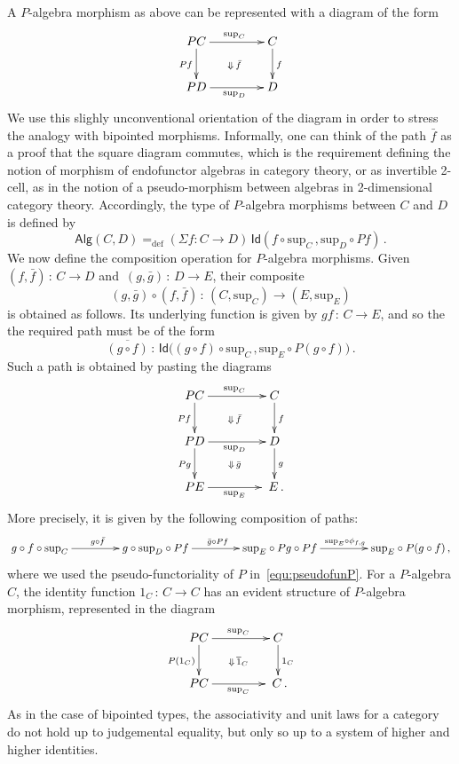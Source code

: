 \documentclass[10pt,a4paper,oneside,reqno]{amsart}
\numberwithin{equation}{section}
\theoremstyle{mythm}
\theoremstyle{mydef}
\theoremstyle{myrmk}
\newcommand{\defeq}{=_{\mathrm{def}}}
\newcommand{\co}{\,{:}\,}
\newcommand{\Id}{\mathsf{Id}}
\newcommand{\Palg}{\mathsf{Alg}}
\renewcommand{\sup}{\mathrm{sup}}
\begin{document}
A $P$-algebra morphism as above can be represented with a diagram of the form
\[
\xymatrix@C=1.5cm{
 PC \ar[r]^{\sup_C} \ar[d]_{Pf}  \ar@{}[dr]|{\Downarrow \, \bar{f}} &  C \ar[d]^{f}\\
PD \ar[r]_{\sup_D}   & D}
\] 
We use this slighly unconventional orientation of the diagram in order to stress the analogy with bipointed morphisms.
Informally, one can think of the path $\bar{f}$ as a proof that the square diagram commutes, which is the 
requirement defining the notion of morphism of endofunctor algebras in category theory, or as invertible
2-cell, as in the notion of a pseudo-morphism between algebras in 2-dimensional category theory.  
Accordingly, the type of $P$-algebra 
morphisms between $C$ and $D$ is defined by
\[
\Palg(C,D)
 \defeq  
(\Sigma f:  C \rightarrow D) \, \Id(f\circ \sup_C  \, , \sup_D \circ P f    )  \, .
\]
We now define the composition operation for $P$-algebra morphisms. Given $(f, \bar{f}) \co C \to D$ and~$(g, \bar{g}) \co D \to E$,
their composite 
\[
(g, \bar{g}) \circ (f, \bar{f}) \co (C, \sup_C) \to (E, \sup_E)
\] 
is obtained as follows. Its underlying function is given by $gf\co C \to E$, and so the 
the required path must be of the form
\[
 \overline{(g \circ f)} \co \Id\big( (g \circ f) \circ \sup_C   \, ,  \sup_E \circ P(g \circ f)  \big)\, .
\]
Such a path is obtained by pasting the diagrams 
\[
\xymatrix@C=1.5cm{
 PC \ar[r]^{\sup_C} \ar[d]_{Pf}  \ar@{}[dr]|{\Downarrow \, \bar{f}} &  C \ar[d]^{f}\\
PD \ar[r]_{\sup_D}  \ar[d]_{Pg}   \ar@{}[dr]|{\Downarrow \, \bar{g}} & D \ar[d]^g  \\
PE \ar[r]_{\sup_E} & \; E  \, .}
\] 
More precisely, it is given by the following composition of paths:
\[
\xymatrix@C=1.5cm{
g \circ f \circ \sup_C \ar[r]^{g \circ \bar{f}} & 
g \circ \sup_D \circ Pf \ar[r]^{\bar{g} \circ Pf} & 
\sup_E \circ Pg \circ Pf \ar[r]^{\sup_E \circ \phi_{f,g}} &
\sup_E \circ P(g \circ f) \, ,}
\]
where we used the pseudo-functoriality of $P$ in~\eqref{equ:pseudofunP}. 
For a $P$-algebra $C$,  the identity function $1_C \co C \to C$ has an evident structure of $P$-algebra morphism,
represented in the diagram
\begin{equation}
\label{equ:palgid}
\xymatrix@C=1.5cm{
PC \ar[d]_{P(1_C)}  \ar[r]^{\sup_C} \ar@{}[dr]|{\Downarrow \, \overline{1}_C} & C \ar[d]^{1_C} \\
PC \ar[r]_{\sup_C} & \; C \, .}
\end{equation}
As in the case of bipointed types, the associativity and unit laws for a category do not hold up to judgemental equality, but only so up to a system of higher and higher identities. 
\end{document}

